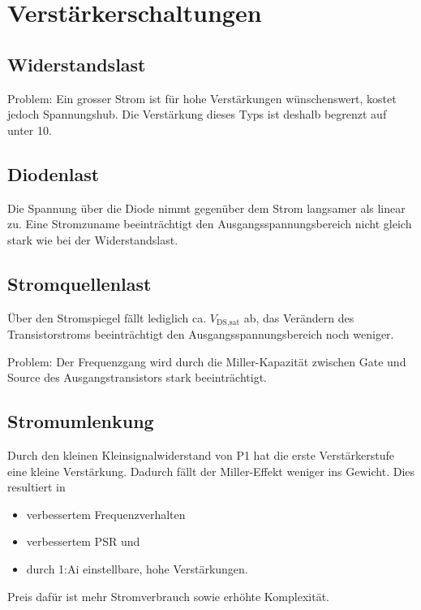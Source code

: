 \section{Verstärkerschaltungen}

\subsection{Widerstandslast}

Problem: Ein grosser Strom ist für hohe Verstärkungen wünschenswert, kostet jedoch Spannungshub.
Die Verstärkung dieses Typs ist deshalb begrenzt auf unter 10.

\subsection{Diodenlast}


Die Spannung über die Diode nimmt gegenüber dem Strom langsamer als linear zu.
Eine Stromzuname beeinträchtigt den Ausgangsspannungsbereich nicht gleich stark wie bei der Widerstandslast.

\subsection{Stromquellenlast}

Über den Stromspiegel fällt lediglich ca. $V_\text{DS,sat}$ ab, das Verändern des Transistorstroms beeinträchtigt den Ausgangsspannungsbereich noch weniger.

Problem: Der Frequenzgang wird durch die Miller-Kapazität zwischen Gate und Source des Ausgangstransistors stark beeinträchtigt.

\subsection{Stromumlenkung}

Durch den kleinen Kleinsignalwiderstand von P1 hat die erste Verstärkerstufe eine kleine Verstärkung. 
Dadurch fällt der Miller-Effekt weniger ins Gewicht.
Dies resultiert in
\begin{itemize}
    \item verbessertem Frequenzverhalten
    \item verbessertem PSR und
    \item durch 1:Ai einstellbare, hohe Verstärkungen.
\end{itemize}
Preis dafür ist mehr Stromverbrauch sowie erhöhte Komplexität.

